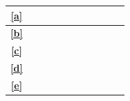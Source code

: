 \documentclass{article}
\begin{document}
\begin{table}[H]
\begin{tabular}{|c|c|c|c|c|c|c|c|c|c|c|}
    \textbf{\ref{a}}                     & \cellcolor{bleu_cite}                                               & \cellcolor{bleu_cite}                                               &                                                                    &                                                                    &                                                                     &                                                                    &                                                                    &                                                                      \\ \hline
    \textbf{\ref{b}}                     & \cellcolor{bleu_cite}                                               &                                                                     &                                                                    &                                                                    &                                                                     &                                                                    &                                                                    &                                                                      \\ \hline
	\textbf{\ref{c}}                     & \cellcolor{bleu_cite}                                               &                                                                     &                                                                    &                                                                    &                                                                     &                                                                    &                                                                    &                                                                      \\ \hline
	\textbf{\ref{d}}                     & \cellcolor{bleu_cite}                                               & \cellcolor{bleu_cite}                                               &                                                                    &                                                                    &                                                                     &                                                                    &                                                                    &                                                                      \\ \hline
	\textbf{\ref{e}}                     &                                                                     & \cellcolor{bleu_cite}                                               &                                                                    &                                                                    &                                                                     &                                                                    &                                                                    &                                                                      \\ \hline

\end{tabular}
\end{table}
\end{document}
